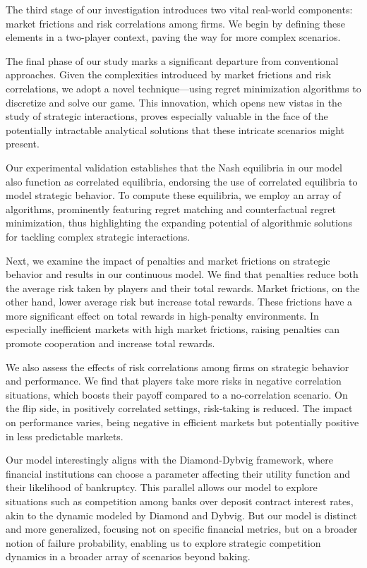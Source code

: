 \documentclass[preprint,12pt,authoryear]{elsarticle}
\theoremstyle{definition}
\begin{document}
The third stage of our investigation introduces two vital real-world components: market frictions and risk correlations among firms. We begin by defining these elements in a two-player context, paving the way for more complex scenarios.

The final phase of our study marks a significant departure from conventional approaches. Given the complexities introduced by market frictions and risk correlations, we adopt a novel technique—using regret minimization algorithms to discretize and solve our game. This innovation, which opens new vistas in the study of strategic interactions, proves especially valuable in the face of the potentially intractable analytical solutions that these intricate scenarios might present. 

Our experimental validation establishes that the Nash equilibria in our model also function as correlated equilibria, endorsing the use of correlated equilibria to model strategic behavior. To compute these equilibria, we employ an array of algorithms, prominently featuring regret matching and counterfactual regret minimization, thus highlighting the expanding potential of algorithmic solutions for tackling complex strategic interactions.

Next, we examine the impact of penalties and market frictions on strategic behavior and results in our continuous model. We find that penalties reduce both the average risk taken by players and their total rewards. Market frictions, on the other hand, lower average risk but increase total rewards. These frictions have a more significant effect on total rewards in high-penalty environments. In especially inefficient markets with high market frictions, raising penalties can promote cooperation and increase total rewards.

We also assess the effects of risk correlations among firms on strategic behavior and performance. We find that players take more risks in negative correlation situations, which boosts their payoff compared to a no-correlation scenario. On the flip side, in positively correlated settings, risk-taking is reduced. The impact on performance varies, being negative in efficient markets but potentially positive in less predictable markets.

Our model interestingly aligns with the Diamond-Dybvig framework, where financial institutions can choose a parameter affecting their utility function and their likelihood of bankruptcy. This parallel allows our model to explore situations such as competition among banks over deposit contract interest rates, akin to the dynamic modeled by Diamond and Dybvig. But our model is distinct and more generalized, focusing not on specific financial metrics, but on a broader notion of failure probability, enabling us to explore strategic competition dynamics in a broader array of scenarios beyond baking.
\end{document}
